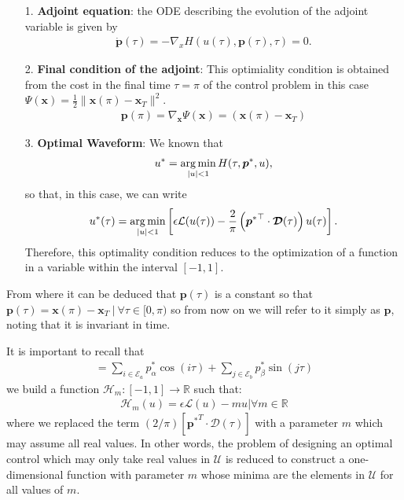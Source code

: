 \begin{itemize}
    \item[1.] \textbf{Adjoint equation}: the ODE describing the evolution of the adjoint variable is given by 
    \begin{gather}
    	\dot{\bm{p}}(\tau) = -\nabla_x H(u(\tau),\bm{p}(\tau),\tau) = 0.
    \end{gather}
    
	\item[2.] \textbf{Final condition of the adjoint}: This optimiality condition is obtained from the cost in the final time $\tau = \pi$ of the control problem in this case $ \Psi (\bm{x}) = \frac {1}{2} \| \bm{x} (\pi) - \bm{x}_T \|^2 $.
    \begin{gather}
    	\bm{p}(\pi) = \nabla_{\bm{x}} \Psi(\bm{x}) =  (\bm{x} (\pi) - \bm{x}_T)
    \end{gather} 
    
    \item[3.] \textbf{Optimal  Waveform}: We known that 
    \begin{align*}
    	u^* = \operatorname*{arg\,min}_{|u|<1} H(\tau,\bm{p}^*,u),
    \end{align*}
	so that, in this case, we can write
    \begin{gather}
        u^*(\tau) = \operatorname*{arg\,min}_{|u|<1}  \left[\epsilon \mathcal{L}(u(\tau)) - \frac 2\pi \left({\bm{p}^*}^\top \cdot \bm{\mathcal{D}}(\tau)\right) u(\tau) \right].
    \end{gather}
    Therefore, this optimality condition reduces to the optimization of a function in a variable within the interval $ [- 1,1] $. 
\end{itemize}

From where it can be deduced that $ \bm {p} (\tau)$ is a constant so that $ \bm {p} (\tau) = \bm {x} (\pi) - \bm { x} _T \ | \ \forall \tau \in [0, \pi) $ so from now on we will refer to it simply as $ \bm {p} $, noting that it is invariant in time. 


%
It is important to recall that
\begin{gather}
	[{\bm{p}^*}^T \cdot \bm{\mathcal{D}}(\tau)] = \sum_{i \in \mathcal{E}_a} p^*_\alpha \cos(i\tau) + \sum_{j \in \mathcal{E}_b} p^*_\beta \sin(j\tau) 
\end{gather}
we build a function $\mathcal{H}_m: [-1,1] \rightarrow \mathbb{R}$ such that:
\begin{gather}\label{Hm}
    \mathcal{H}_m(u) = \epsilon \mathcal{L}(u) - mu  |  \forall m \in \mathbb{R}
\end{gather}
where we replaced the term $(2/\pi)[{\bm{p}^*}^T \cdot \bm{\mathcal{D}}(\tau)]$ with a parameter $m$ which may assume all real values. In other words, the problem of designing an optimal control which may only take real values in $\mathcal{U}$ is reduced to construct a one-dimensional function with parameter $m$ whose minima are the elements in $\mathcal{U}$ for all values of $m$. 

